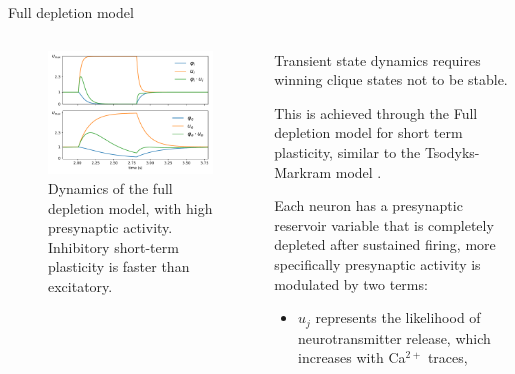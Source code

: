 \documentclass[final,hyperref={pdfpagelabels=false}]{beamer}
\begin{document}
\begin{frame}
\begin{columns}
\begin{column}{.64\textwidth}
\begin{minipage}[T]{.95\textwidth}
{		%
		\begin{block}{Full depletion model}
			\begin{columns}
				\begin{column}[T]{.5\textwidth}
				\begin{figure}
					\includegraphics[width=1\linewidth]{double_depletion.pdf}
					\caption{Dynamics of the full depletion model, with high presynaptic activity.  Inhibitory short-term plasticity is faster than excitatory.}
					\label{fig:full_depletion}
				\end{figure}	
				\end{column}							
				
				\begin{column}[T]{.5\textwidth}
					Transient state dynamics requires winning clique states not to be stable. 
					
					This is achieved through the Full depletion model for short term plasticity, similar to the Tsodyks-Markram model \cite{tsodyks2008model}.
					
					Each neuron has a presynaptic reservoir variable that is completely depleted after sustained firing, more specifically presynaptic activity is modulated by two terms:
					\begin{itemize}
						\item $u_j$ represents the likelihood of neurotransmitter release, which increases with Ca$^{2+}$ traces,
						

\end{itemize}
\end{column}
\end{columns}
\end{block}}
\end{minipage}
\end{column}
\end{columns}
\end{frame}
\end{document}
